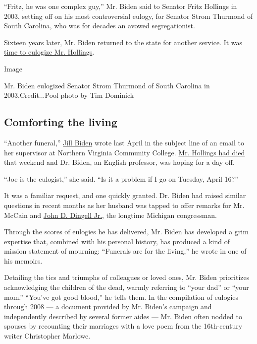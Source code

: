 ``Fritz, he was one complex guy,'' Mr. Biden said to Senator Fritz
Hollings in 2003, setting off on his most controversial eulogy, for
Senator Strom Thurmond of South Carolina, who was for decades an avowed
segregationist.

Sixteen years later, Mr. Biden returned to the state for another
service. It was
\href{https://www.nytimes.com/2019/04/16/us/politics/biden-hollings-funeral.html}{time
to eulogize Mr. Hollings}.

Image

Mr. Biden eulogized Senator Strom Thurmond of South Carolina in
2003.Credit...Pool photo by Tim Dominick

\hypertarget{comforting-the-living}{%
\subsection{Comforting the living}\label{comforting-the-living}}

``Another funeral,''
\href{https://www.nytimes.com/2020/02/01/us/politics/joe-jill-biden-2020.html}{Jill
Biden} wrote last April in the subject line of an email to her
supervisor at Northern Virginia Community College.
\href{https://www.nytimes.com/2019/04/06/obituaries/ernest-hollings-dead.html}{Mr.
Hollings had died} that weekend and Dr. Biden, an English professor, was
hoping for a day off.

``Joe is the eulogist,'' she said. ``Is it a problem if I go on Tuesday,
April 16?''

It was a familiar request, and one quickly granted. Dr. Biden had raised
similar questions in recent months as her husband was tapped to offer
remarks for Mr. McCain and
\href{https://www.nytimes.com/2019/02/07/us/politics/john-dingell-dead-longest-congressman.html}{John
D. Dingell Jr.}, the longtime Michigan congressman.

Through the scores of eulogies he has delivered, Mr. Biden has developed
a grim expertise that, combined with his personal history, has produced
a kind of mission statement of mourning: ``Funerals are for the
living,'' he wrote in one of his memoirs.

Detailing the tics and triumphs of colleagues or loved ones, Mr. Biden
prioritizes acknowledging the children of the dead, warmly referring to
``your dad'' or ``your mom.'' ``You've got good blood,'' he tells them.
In the compilation of eulogies through 2008 --- a document provided by
Mr. Biden's campaign and independently described by several former aides
--- Mr. Biden often nodded to spouses by recounting their marriages with
a love poem from the 16th-century writer Christopher Marlowe.

